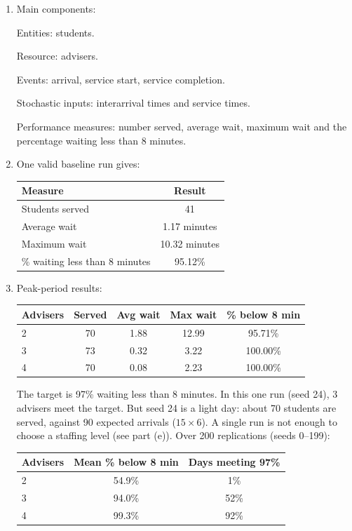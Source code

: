 \documentclass[11pt,a4paper]{article}
\begin{document}
\begin{enumerate}
\item Main components:

Entities: students.

Resource: advisers.

Events: arrival, service start, service completion.

Stochastic inputs: interarrival times and service times.

Performance measures: number served, average wait, maximum wait and the percentage waiting less than 8 minutes.

\item One valid baseline run gives:

\begin{center}
\begin{tabular}{lc}
\toprule
Measure & Result \\
\midrule
Students served & 41 \\
Average wait & 1.17 minutes \\
Maximum wait & 10.32 minutes \\
\% waiting less than 8 minutes & 95.12\% \\
\bottomrule
\end{tabular}
\end{center}

\item Peak-period results:

\begin{center}
\begin{tabular}{lcccc}
\toprule
Advisers & Served & Avg wait & Max wait & \% below 8 min \\
\midrule
2 & 70 & 1.88 & 12.99 & 95.71\% \\
3 & 73 & 0.32 & 3.22 & 100.00\% \\
4 & 70 & 0.08 & 2.23 & 100.00\% \\
\bottomrule
\end{tabular}
\end{center}

The target is 97\% waiting less than 8 minutes.
In this one run (seed 24), 3 advisers meet the target.
But seed 24 is a light day: about 70 students are served, against 90 expected arrivals ($15 \times 6$).
A single run is not enough to choose a staffing level (see part (e)).
Over 200 replications (seeds 0--199):

\begin{center}
\begin{tabular}{lcc}
\toprule
Advisers & Mean \% below 8 min & Days meeting 97\% \\
\midrule
2 & 54.9\% & 1\% \\
3 & 94.0\% & 52\% \\
4 & 99.3\% & 92\% \\
\bottomrule
\end{tabular}
\end{center}


\end{enumerate}
\end{document}

